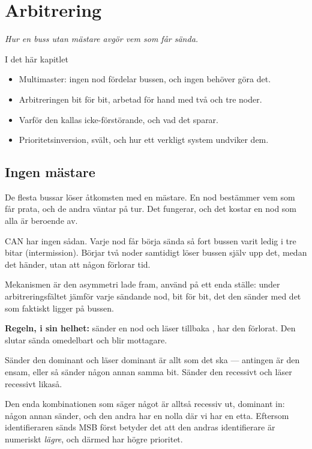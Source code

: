 \chapter{Arbitrering}
\label{ch:arbitrering}

{\large\itshape Hur en buss utan mästare avgör vem som får sända.\par}

\begin{chapterbox}{I det här kapitlet}
\begin{itemize}
  \item Multimaster: ingen nod fördelar bussen, och ingen behöver göra det.
  \item Arbitreringen bit för bit, arbetad för hand med två och tre noder.
  \item Varför den kallas icke-förstörande, och vad det sparar.
  \item Prioritetsinversion, svält, och hur ett verkligt system undviker dem.
\end{itemize}
\end{chapterbox}

\section{Ingen mästare}

De flesta bussar löser åtkomsten med en mästare. En nod bestämmer vem som får prata, och de andra
väntar på tur. Det fungerar, och det kostar en nod som alla är beroende av.

CAN har ingen sådan. Varje nod får börja sända så fort bussen varit ledig i tre bitar
(intermission). Börjar två noder samtidigt löser bussen själv upp det, medan det händer, utan
att någon förlorar tid.

Mekanismen är den asymmetri  lade fram, använd på ett enda ställe: under
arbitreringsfältet jämför varje sändande nod, bit för bit, det den sänder med det som faktiskt
ligger på bussen.

\begin{aside}
\textbf{Regeln, i sin helhet:} sänder en nod \rec{} och läser tillbaka \dom{}, har den förlorat.
Den slutar sända omedelbart och blir mottagare.
\end{aside}

Sänder den dominant och läser dominant är allt som det ska --- antingen är den ensam, eller så
sänder någon annan samma bit. Sänder den recessivt och läser recessivt likaså.

Den enda kombinationen som säger något är alltså recessiv ut, dominant in: någon annan sänder,
och den andra har en nolla där vi har en etta. Eftersom identifieraren sänds MSB först betyder
det att den andras identifierare är numeriskt \emph{lägre}, och därmed har högre prioritet.

